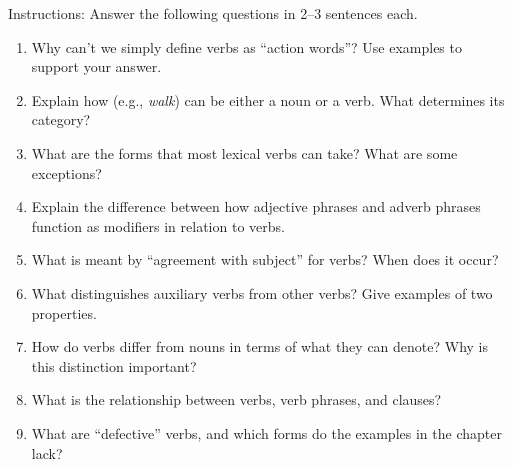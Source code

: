 \begin{tcolorbox}[title=Short Answer Quiz, colback=white]

Instructions: Answer the following questions in 2--3 sentences each.

\begin{enumerate}[noitemsep]
    \item Why can't we simply define verbs as ``action words''? Use examples to support your answer.
    \item Explain how (e.g., \textit{walk}) can be either a noun or a verb. What determines its category?
    \item What are the forms that most lexical verbs can take? What are some exceptions?
    \item Explain the difference between how adjective phrases and adverb phrases function as modifiers in relation to verbs.
    \item What is meant by ``agreement with subject'' for verbs? When does it occur?
    \item What distinguishes auxiliary verbs from other verbs? Give examples of two properties.
    \item How do verbs differ from nouns in terms of what they can denote? Why is this distinction important?
    \item What is the relationship between verbs, verb phrases, and clauses?
    \item What are ``defective'' verbs, and which forms do the examples in the chapter lack?
\end{enumerate}
    
\end{tcolorbox}


